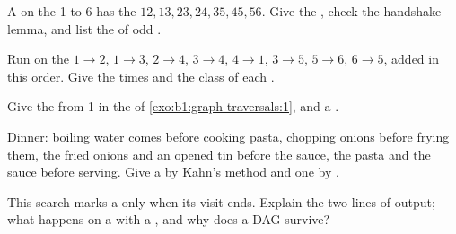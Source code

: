 \begin{exercise}[$\star$]\label{exo:b1:graph-traversals:1}
A  on the  1 to 6 has the  $12, 13, 23, 24, 35, 45, 56$. Give the , check the handshake lemma,
and list the  of odd .
\end{exercise}

\begin{exercise}[$\star$]\label{exo:b1:graph-traversals:2}
Run  on the  $1 \to 2$, $1 \to 3$, $2 \to 4$, $3 \to 4$, $4 \to 1$, $3 \to 5$, $5 \to 6$, $6 \to 5$, added
in this order. Give the times and the class of each .
\end{exercise}

\begin{exercise}[$\star$]\label{exo:b1:graph-traversals:3}
Give the  from  1 in the  of \cref{exo:b1:graph-traversals:1}, and a .
\end{exercise}

\begin{exercise}[$\star$]\label{exo:b1:graph-traversals:4}
Dinner: boiling water comes before cooking pasta, chopping onions before frying them, the fried onions and an opened tin
before the sauce, the pasta and the sauce before serving. Give a  by Kahn's method and one by
.
\end{exercise}

\begin{exercise}[$\star\star$]\label{exo:b1:graph-traversals:5}
This search marks a  only when its visit ends. Explain the two lines of output; what happens on a  with
a , and why does a DAG survive?
\end{exercise}

